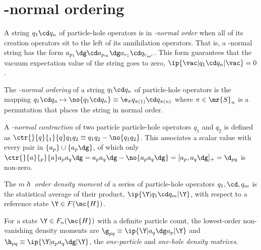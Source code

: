 \documentclass[11pt,fleqn]{article}
\numberwithin{equation}{section}
\begin{document}
\section{\vac-normal ordering}

\begin{dfn}
A string $q_1\cd q_n$ of particle-hole operators is in \textit{\vac-normal order} when all of its creation operators sit to the left of its annihilation operators.
That is, a \vac-normal string has the form $a_{p_1}\dg\cd a_{p_m}\dg a_{r_1}\cd q_{r_{m'}}$.
This form guarantees that the vacuum expectation value of the string goes to zero, $\ip{\vac|q_1\cd q_n|\vac}=0$.
\end{dfn}

\begin{dfn}
The \textit{\vac-normal ordering} of a string $q_1\cd q_n$ of particle-hole operators is the mapping $q_1\cd q_n\mapsto\no{q_1\cd q_n}\equiv\e_{\pi}q_{\pi(1)}\cd q_{\pi(n)}$ where $\pi\in\mr{S}_n$ is a permutation that places the string in normal order.
\end{dfn}

\begin{dfn}\label{vac-normal-contraction}
A \textit{\vac-normal contraction} of two particle particle-hole operators $q_1$ and $q_2$ is defined as $\ctr{}{q}{_1}{q}q_1q_2\equiv q_1q_2 - \no{q_1q_2}$.
This associates a scalar value with every pair in $\{a_p\}\cup\{a_p\dg\}$, of which only
$\ctr{}{a}{_p}{a} a_pa_q\dg=a_pa_q\dg - \no{a_pa_q\dg}=[a_p,a_q\dg]_+=\d_{pq}$
is non-zero.
\end{dfn}

\begin{dfn}
The \textit{$m\eth$ order density moment} of a series of particle-hole operators $q_1,\cd,q_m$ is the statistical average of their product, $\ip{\Y|q_1\cd q_m|\Y}$, with respect to a reference state $\Y\in F(\mc{H})$.
\end{dfn}

\begin{dfn}
For a state $\Y\in F_n(\mc{H})$ with a definite particle count, the lowest-order non-vanishing density moments are $\g_{pq}\equiv\ip{\Y|a_q\dg a_p|\Y}$ and $\h_{pq}\equiv\ip{\Y|a_pa_q\dg|\Y}$, the \textit{one-particle} and \textit{one-hole density matrices}.
\end{dfn}
\end{document}
